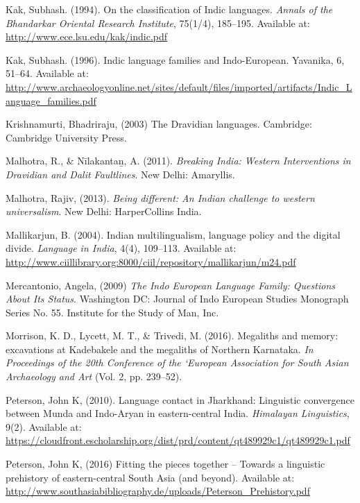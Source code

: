 \begin{thebibliography}{99}
  Kak, Subhash. (1994). On the classification of Indic languages. \textit{Annals of the Bhandarkar Oriental Research Institute}, 75(1/4), 185–195. Available at: \url{http://www.ece.lsu.edu/kak/indic.pdf}

  Kak, Subhash. (1996). Indic language families and Indo-European. Yavanika, 6, 51–64. Available at: \url{http://www.archaeologyonline.net/sites/default/files/imported/artifacts/Indic_Language_families.pdf}

  Krishnamurti, Bhadriraju, (2003) The Dravidian languages. Cambridge: Cambridge University Press.

  Malhotra, R., \& Nīlakantan̲, A. (2011). \textit{Breaking India: Western Interventions in Dravidian and Dalit Faultlines}. New Delhi: Amaryllis.

  Malhotra, Rajiv, (2013). \textit{Being different: An Indian challenge to western universalism}. New Delhi: HarperCollins India.

  Mallikarjun, B. (2004). Indian multilingualism, language policy and the digital divide. \textit{Language in India}, 4(4), 109–113. Available at: \url{http://www.ciillibrary.org:8000/ciil/repository/mallikarjun/m24.pdf}

  Mercantonio, Angela, (2009) \textit{The Indo European Language Family: Questions About Its Status}. Washington DC: Journal of Indo European Studies Monograph Series No. 55. Institute for the Study of Man, Inc.

  Morrison, K. D., Lycett, M. T., \& Trivedi, M. (2016). Megaliths and memory: excavations at Kadebakele and the megaliths of Northern Karnataka. \textit{In Proceedings of the 20th Conference of the ‘European Association for South Asian Archaeology and Art} (Vol. 2, pp. 239–52).

  Peterson, John K, (2010). Language contact in Jharkhand: Linguistic convergence between Munda and Indo-Aryan in eastern-central India. \textit{Himalayan Linguistics}, 9(2). Available at: \url{https://cloudfront.escholarship.org/dist/prd/content/qt489929c1/qt489929c1.pdf}

  Peterson, John K, (2016) Fitting the pieces together – Towards a linguistic prehistory of eastern-central South Asia (and beyond). Available at: \url{http://www.southasiabibliography.de/uploads/Peterson_Prehistory.pdf}


\end{thebibliography}
